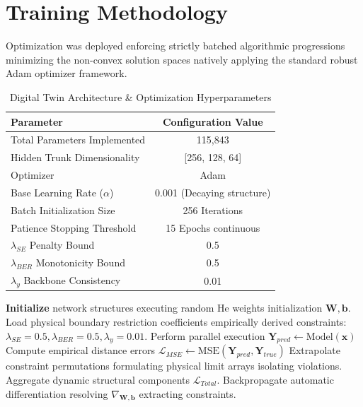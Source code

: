 \documentclass[conference]{IEEEtran}
\begin{document}
\section{Training Methodology}

Optimization was deployed enforcing strictly batched algorithmic progressions minimizing the non-convex solution spaces natively applying the standard robust Adam optimizer framework.

\begin{table}[htbp]
\caption{Digital Twin Architecture \& Optimization Hyperparameters}
\begin{center}
\begin{tabular}{|l|c|}
\hline
\textbf{Parameter} & \textbf{Configuration Value} \\
\hline
Total Parameters Implemented & 115,843 \\
Hidden Trunk Dimensionality & [256, 128, 64] \\
Optimizer & Adam \\
Base Learning Rate ($\alpha$) & 0.001 (Decaying structure) \\
Batch Initialization Size & 256 Iterations \\
Patience Stopping Threshold & 15 Epochs continuous \\
$\lambda_{SE}$ Penalty Bound & 0.5 \\
$\lambda_{BER}$ Monotonicity Bound & 0.5 \\
$\lambda_{y}$ Backbone Consistency & 0.01 \\
\hline
\end{tabular}
\label{tab:hyperparams}
\end{center}
\end{table}

\begin{algorithm}
\caption{Physics-Informed Optimization Training Flow}
\begin{algorithmic}[1]
\STATE \textbf{Initialize} network structures executing random He weights initialization $\mathbf{W}, \mathbf{b}$.
\STATE Load physical boundary restriction coefficients empirically derived constraints: $\lambda_{SE}=0.5, \lambda_{BER}=0.5, \lambda_{y}=0.01$.
        \STATE Perform parallel execution $\mathbf{Y}_{pred} \gets \text{Model}(\mathbf{x})$
        \STATE Compute empirical distance errors $\mathcal{L}_{MSE} \gets \text{MSE}(\mathbf{Y}_{pred}, \mathbf{Y}_{true})$
        \STATE Extrapolate constraint permutations formulating physical limit arrays isolating violations.
        \STATE Aggregate dynamic structural components $\mathcal{L}_{Total}$.
        \STATE Backpropagate automatic differentiation resolving $\nabla_{\mathbf{W},\mathbf{b}}$ extracting constraints.
    \ENDFOR
\ENDFOR
\end{algorithmic}
\label{alg:train}
\end{algorithm}
\end{document}
